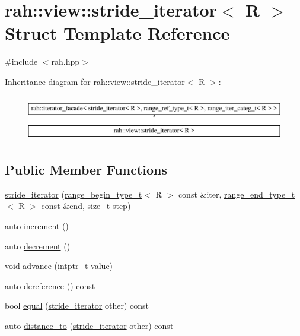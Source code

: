 \hypertarget{structrah_1_1view_1_1stride__iterator}{}\section{rah\+::view\+::stride\+\_\+iterator$<$ R $>$ Struct Template Reference}
\label{structrah_1_1view_1_1stride__iterator}


{\ttfamily \#include $<$rah.\+hpp$>$}

Inheritance diagram for rah\+::view\+::stride\+\_\+iterator$<$ R $>$\+:\begin{figure}[H]
\begin{center}
\leavevmode
\includegraphics[height=2.000000cm]{structrah_1_1view_1_1stride__iterator}
\end{center}
\end{figure}
\subsection*{Public Member Functions}
\begin{DoxyCompactItemize}
\item 
\mbox{\hyperlink{structrah_1_1view_1_1stride__iterator_a47ddd2ce0f295fa825919f04431d64a9}{stride\+\_\+iterator}} (\mbox{\hyperlink{namespacerah_afa7f59d1f37c7b9d9caed37551be9eaa}{range\+\_\+begin\+\_\+type\+\_\+t}}$<$ R $>$ const \&iter, \mbox{\hyperlink{namespacerah_a3042a09fc211e86eea6771d01375d263}{range\+\_\+end\+\_\+type\+\_\+t}}$<$ R $>$ const \&\mbox{\hyperlink{namespacerah_aaddd1442cd76b96876e692cdefe7261d}{end}}, size\+\_\+t step)
\item 
auto \mbox{\hyperlink{structrah_1_1view_1_1stride__iterator_ae98465362884b064db4184a406221154}{increment}} ()
\item 
auto \mbox{\hyperlink{structrah_1_1view_1_1stride__iterator_a8104aed5699a5f26626c8a010a97f5f4}{decrement}} ()
\item 
void \mbox{\hyperlink{structrah_1_1view_1_1stride__iterator_aede4ba99f4ede1afdad678bd0dba4f7b}{advance}} (intptr\+\_\+t value)
\item 
auto \mbox{\hyperlink{structrah_1_1view_1_1stride__iterator_af8bc6022711a953e2b8dce5b7e7553dd}{dereference}} () const
\item 
bool \mbox{\hyperlink{structrah_1_1view_1_1stride__iterator_a34c24e935ee7beebcd7269ee314e245a}{equal}} (\mbox{\hyperlink{structrah_1_1view_1_1stride__iterator}{stride\+\_\+iterator}} other) const
\item 
auto \mbox{\hyperlink{structrah_1_1view_1_1stride__iterator_ad30be3983aec3fab52efb32a1a461056}{distance\+\_\+to}} (\mbox{\hyperlink{structrah_1_1view_1_1stride__iterator}{stride\+\_\+iterator}} other) const
\end{DoxyCompactItemize}
